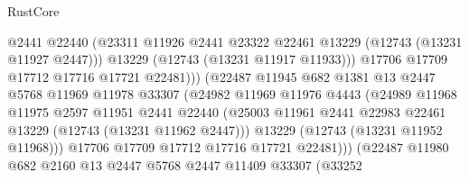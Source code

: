 \begin{lexlean}{RustCore}
\begin{coremodule}
                                    @2441
                                    @22440
                                    (@23311
                                      @11926
                                      @2441
                                      @23322
                                      @22461
                                      @13229
                                      (@12743 (@13231 @11927 @2447)))
                                    @13229
                                    (@12743 (@13231 @11917 @11933)))
                                  @17706
                                  @17709
                                  @17712
                                  @17716
                                  @17721
                                  @22481)))
                            (@22487
                              @11945
                              @682
                              @1381
                              @13
                              @2447
                              @5768
                              @11969
                              @11978
                              @33307
                              (@24982
                                @11969
                                @11976
                                @4443
                                (@24989
                                  @11968
                                  @11975
                                  @2597
                                  @11951
                                  @2441
                                  @22440
                                  (@25003
                                    @11961
                                    @2441
                                    @22983
                                    @22461
                                    @13229
                                    (@12743 (@13231 @11962 @2447)))
                                  @13229
                                  (@12743 (@13231 @11952 @11968)))
                                @17706
                                @17709
                                @17712
                                @17716
                                @17721
                                @22481)))
                          (@22487
                            @11980
                            @682
                            @2160
                            @13
                            @2447
                            @5768
                            @2447
                            @11409
                            @33307
                            (@33252

\end{coremodule}
\end{lexlean}
